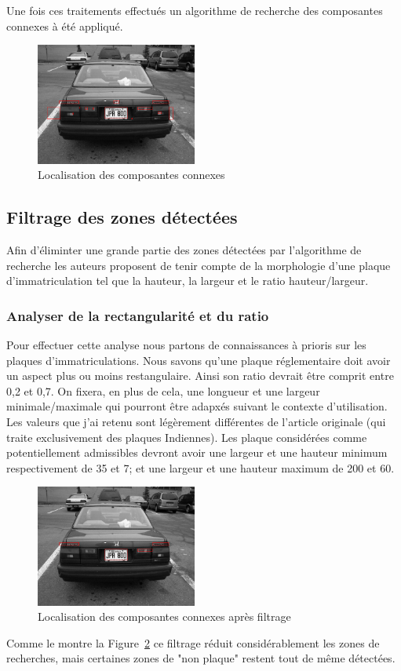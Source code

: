 \documentclass[a4paper,10pt,twocolumn]{article}
\begin{document}
Une fois ces traitements effectués un algorithme de recherche des composantes connexes à été appliqué.
\begin{figure}[H]
	\centering 
	  \includegraphics[width=200px]{img/991213-006_detect_1.png}
	\caption{Localisation des composantes connexes\label{connexes}}
\end{figure}

\subsection{Filtrage des zones détectées}
Afin d'éliminter une grande partie des zones détectées par l'algorithme de recherche les auteurs proposent de tenir compte de la morphologie d'une plaque d'immatriculation tel que la hauteur, la largeur et le ratio hauteur/largeur.

\subsubsection{Analyser de la rectangularité et du ratio} 
Pour effectuer cette analyse nous partons de connaissances à prioris sur les plaques d'immatriculations. Nous savons qu'une plaque réglementaire doit avoir un aspect plus ou moins restangulaire. Ainsi son ratio devrait être comprit entre 0,2 et 0,7. On fixera, en plus de cela, une longueur et une largeur minimale/maximale qui pourront être adapxés suivant le contexte d'utilisation. Les valeurs que j'ai retenu sont légèrement différentes de l'article originale (qui traite exclusivement des plaques Indiennes). Les plaque considérées comme potentiellement admissibles devront avoir une largeur et une hauteur minimum respectivement de 35 et 7; et une largeur et une hauteur maximum de 200 et 60.
\begin{figure}[H]
	\centering 
	  \includegraphics[width=200px]{img/991213-006_detect_2.png}
	\caption{Localisation des composantes connexes après filtrage\label{connexes_2}}
\end{figure}
Comme le montre la Figure~\ref{connexes_2} ce filtrage réduit considérablement les zones de recherches, mais certaines zones de "non plaque" restent tout de même détectées.
\end{document}
